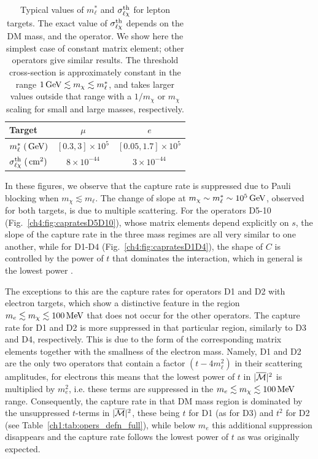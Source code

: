 \begin{table}[t!bp]
    \centering
    \begin{tabular}{l c c}
    \toprule
    Target & $\mu$ & $e$  \\
    \midrule\midrule
    $m_\ell^*\; ({\rm \,GeV})$  & $[0.3,3] \times 10^{5}$ & $[0.05,1.7] \times 10^{5}$  \\
    $\sigma^{\rm th}_{\ell\chi}\; ({\rm \,cm}^2)$ &  $8\times 10^{-44}$ & $3\times 10^{-44}$ \\
    \bottomrule
    \end{tabular} 
    \caption[Typical values of $m_\ell^*$ and $\sigmathl$ for lepton targets. ]{Typical values of $m_\ell^*$ and $\sigmathl$ for lepton targets. 
    The exact value of $\sigmathl$ depends on the DM mass, and the operator. We show here the simplest case of constant matrix element; other operators give similar results. The threshold cross-section is approximately constant in the range $1{\rm \,GeV}\lesssim m_\chi\lesssim m_\ell^*$, and takes larger values outside that range with a $1/m_\chi$ or $m_\chi$ scaling for small and large masses, respectively. }
    \label{ch4:tab:mstarsigma}
    \end{table} 

In these figures, we observe that the capture rate is suppressed due to Pauli blocking when $m_\chi \lesssim m_\ell$. The change of slope at $m_\chi\sim m_\ell^* \sim 10^5{\rm \,GeV}$, observed for both targets, is due to multiple scattering. 
For the operators D5-10 (Fig.~\ref{ch4:fig:capratesD5D10}), whose matrix elements depend explicitly on $s$,  the slope of the capture rate in the three mass regimes are all very similar to one another, while for D1-D4 (Fig.~\ref{ch4:fig:capratesD1D4}), the shape of $C$ is controlled by the power of $t$ that dominates the interaction, which in general is the lowest power \cite{Bell:2020jou_sep_ImprovedTreatmentDark}. 

The exceptions to this are the capture rates for operators D1 and D2 with electron targets, which show a distinctive feature in the region $m_e\lesssim m_\chi\lesssim 100{\rm \,MeV}$ that does not occur for the other operators.  
The capture rate for D1 and D2 is more suppressed in that particular region, similarly to D3 and D4, respectively. This is due to the form of the corresponding matrix elements together with the smallness of the electron mass. Namely, 
D1 and D2 are the only two operators that contain a factor $(t-4 m_\ell^2)$ in their scattering amplitudes, for electrons this means that the lowest power of $t$ in $|\overline{\mathcal M}|^2$ is multiplied by $m_e^2$, i.e. these terms are suppressed in the $m_e \lesssim m_\chi\lesssim 100{\rm \,MeV}$ range. Consequently, the capture rate in that DM mass region is dominated by the unsuppressed $t$-terms  in $|\overline{\mathcal M}|^2$, these being $t$  for D1 (as for D3) and $t^2$ for D2 (see Table~\ref{ch1:tab:opers_defn_full}), while below $m_e$ this additional suppression disappears and the capture rate follows the lowest power of $t$ as was originally expected. 

